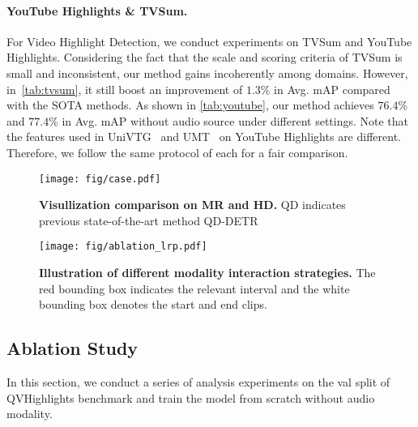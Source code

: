 \vspace{-10pt}
\paragraph{YouTube Highlights \& TVSum.}
For Video Highlight Detection, we conduct experiments on TVSum and YouTube Highlights. Considering the fact that the scale and scoring criteria of TVSum is small and inconsistent, our method gains incoherently among domains.
However, in~\cref{tab:tvsum}, it still boost an improvement of $1.3\%$ in Avg. mAP compared with the SOTA methods. As shown in \cref{tab:youtube}, our method achieves $76.4$\% and $77.4$\% in Avg. mAP without audio source under different settings. 
Note that the features used in UniVTG~\cite{univtg} and UMT~\cite{umt} on YouTube Highlights are different. Therefore, we follow the same protocol of each for a fair comparison.

\begin{figure*}[h]
\vspace{3mm}
    \centering
    \texttt{[image: fig/case.pdf]}
    \caption{\textbf{Visullization comparison on MR and HD.} QD indicates previous state-of-the-art method QD-DETR~\cite{qddetr}}
    \label{fig:case_show}
    \vspace{-10pt}
\end{figure*}
\begin{figure}
    \centering
    \texttt{[image: fig/ablation\_lrp.pdf]}
    \caption{\textbf{Illustration of different modality interaction strategies.}
    The red bounding box indicates the relevant interval and the white bounding box denotes the start and end clips.}
    \label{fig:ablation-lrp}
    \vspace{-15pt}
\end{figure}

\subsection{Ablation Study}
In this section, we conduct a series of analysis experiments on the val split of QVHighlights benchmark and train the model from scratch without audio modality.

